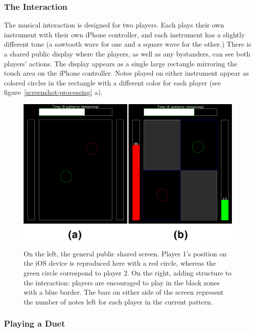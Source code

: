 \documentclass{article}
\begin{document}
\subsubsection{The Interaction}

The musical interaction is designed for two players.  Each plays their own instrument with their own iPhone controller, and each instrument has a slightly different tone (a sawtooth wave for one and a square wave for the other.)  There is a shared public display where the players, as well as any bystanders, can see both players' actions.  The display appears as a single large rectangle mirroring the touch area on the iPhone controller.  Notes played on either instrument appear as colored circles in the rectangle with a different color for each player (see figure~\ref{screenshot-processing} a).

\begin{figure}[tb]
\includegraphics[width=\columnwidth]{screenshot-processing.png}
\caption{On the left, the general public shared screen. Player 1's position on the iOS device is reproduced here with a red circle, whereas the green circle correspond to player 2. On the right, adding structure to the interaction: players are encouraged to play in the black zones with a blue border. The bars on either side of the screen represent the number of notes left for each player in the current pattern.}
\label{struct}
\end{figure}

\subsubsection{Playing a Duet}
\end{document}
